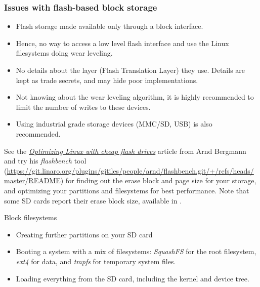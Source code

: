 \begin{frame}
  \frametitle{Issues with flash-based block storage}
  \begin{itemize}
  \item Flash storage made available only through a block interface.
  \item Hence, no way to access a low level flash interface
    and use the Linux filesystems doing wear leveling.
  \item No details about the layer (Flash Translation Layer) they
    use. Details are kept as trade secrets, and may hide poor
    implementations.
  \item Not knowing about the wear leveling algorithm, it is highly
    recommended to limit the number of writes to these devices.
  \item Using industrial grade storage devices (MMC/SD, USB) is
    also recommended.
  \end{itemize}
  See the \href{https://lwn.net/Articles/428584/}{\em Optimizing Linux with
  cheap flash drives} article from Arnd Bergmann and try his {\em
  flashbench} tool (\url{https://git.linaro.org/plugins/gitiles/people/arnd/flashbench.git/+/refs/heads/master/README})
  for finding out the erase block and page size for your storage, and
  optimizing your partitions and filesystems for best performance.
  Note that some SD cards report their erase block size, available in
  .
\end{frame}

\setuplabframe
{Block filesystems}
{
  \begin{itemize}
  \item Creating further partitions on your SD card
  \item Booting a system with a mix of filesystems: {\em SquashFS} for
    the root filesystem, {\em ext4} for data, and {\em
    tmpfs} for temporary system files.
  \item Loading everything from the SD card, including
    the kernel and device tree.
  \end{itemize}
}
